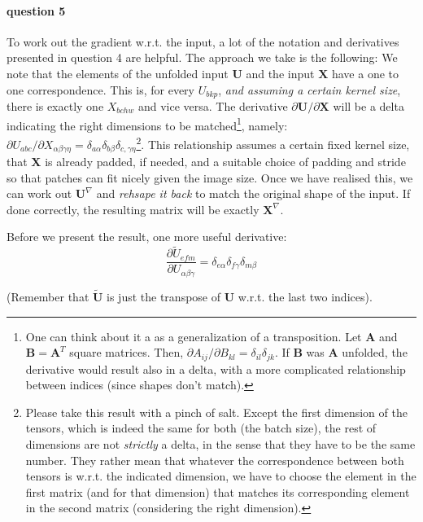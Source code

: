 \documentclass{article}
\begin{document}
\paragraph{question 5} To work out the gradient w.r.t. the input, a lot of the notation and derivatives presented in question 4 are helpful. The approach we take is the following: We note that the elements of the unfolded input \(\mathbf{U}\) and the input \(\mathbf{X}\) have a one to one correspondence. This is, for every \(U_{bkp}\), \emph{and assuming a certain kernel size}, there is exactly one \(X_{bchw}\) and vice versa. The derivative \(\partial \mathbf{U}/ \partial \mathbf{X}\) will be a delta indicating the right dimensions to be matched\footnote{One can think about it a as a generalization of a transposition. Let \(\mathbf{A}\) and \(\mathbf{B} = \mathbf{A}^T\) square matrices. Then, \(\partial A_{ij} / \partial B_{kl} = \delta_{il}\delta_{jk}\). If \(\mathbf{B}\) was \(\mathbf{A}\) unfolded, the derivative would result also in a delta, with a more complicated relationship between indices (since shapes don't match).}, namely: \(\partial U_{abc} / \partial X_{\alpha\beta\gamma\eta} = \delta_{a\alpha}\delta_{b\beta}\delta_{c, \gamma\eta}\)\footnote{Please take this result with a pinch of salt. Except the first dimension of the tensors, which is indeed the same for both (the batch size), the rest of dimensions are not \emph{strictly} a delta, in the sense that they have to be the same number. They rather mean that whatever the correspondence between both tensors is w.r.t. the indicated dimension, we have to choose the element in the first matrix (and for that dimension) that matches its corresponding element in the second matrix (considering the right dimension).}. This relationship assumes a certain fixed kernel size, that \(\mathbf{X}\) is already padded, if needed, and a suitable choice of padding and stride so that patches can fit nicely given the image size. Once we have realised this, we can work out \(\mathbf{U}^\nabla\) and \emph{rehsape it back} to match the original shape of the input. If done correctly, the resulting matrix will be exactly \(\mathbf{X}^\nabla\).

\noindent Before we present the result, one more useful derivative:
\[
    \frac{\partial \tilde{U}_{efm}}{\partial U_{\alpha\beta\gamma}} = \delta_{e\alpha}\delta_{f\gamma}\delta_{m\beta}
\]

\noindent (Remember that \(\mathbf{\tilde{U}}\) is just the transpose of \(\mathbf{U}\) w.r.t. the last two indices).
\end{document}
